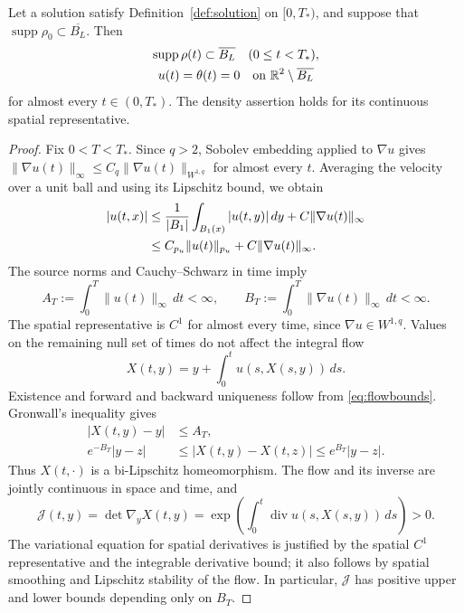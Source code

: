 \documentclass[10pt,twoside]{article}
\newcommand{\R}{\mathbb R}
\newcommand{\dt}{\,dt}
\newcommand{\Div}{\operatorname{div}}
\newcommand{\supp}{\operatorname{supp}}
\newcommand{\norm}[2]{\lVert#1\rVert_{#2}}
\begin{document}
\begin{proposition}\label{prop:fixedsupport}
Let a solution satisfy Definition~\ref{def:solution} on $[0,T_*)$,
and suppose that $\supp\rho_0\subset\overline{B_L}$. Then
\begin{equation}
 \begin{gathered}
 \supp\rho(t)\subset\overline{B_L}\quad(0\le t<T_*),\\
 u(t)=\theta(t)=0\quad\hbox{on }\R^2\setminus\overline{B_L}
 \end{gathered}
 \label{eq:fixedsupport}
\end{equation}
for almost every $t\in(0,T_*)$. The density assertion holds for its
continuous spatial representative.
\end{proposition}

\begin{proof}
Fix $0<T<T_*$. Since $q>2$, Sobolev embedding applied to $\nabla u$
gives
$\norm{\nabla u(t)}{\infty}
\le C_q\norm{\nabla u(t)}{W^{1,q}}$
for almost every $t$. Averaging the velocity over a unit ball and
using its Lipschitz bound, we obtain
\begin{align}
 |u(t,x)|
 &\le \frac1{|B_1|}\int_{B_1(x)}|u(t,y)|\,dy
           +C\norm{\nabla u(t)}{\infty}\notag\\
 &\le C_{p_u}\norm{u(t)}{p_u}
           +C\norm{\nabla u(t)}{\infty}.
 \label{eq:velocitybound}
\end{align}
The source norms and Cauchy--Schwarz in time imply
\begin{equation}
 A_T:=\int_0^T\norm{u(t)}{\infty}\dt<\infty,\qquad
 B_T:=\int_0^T\norm{\nabla u(t)}{\infty}\dt<\infty.
 \label{eq:flowbounds}
\end{equation}
The spatial representative is $C^1$ for almost every time, since
$\nabla u\in W^{1,q}$. Values on the remaining null set of times
do not affect the integral flow
\begin{equation}
 X(t,y)=y+\int_0^t u(s,X(s,y))\,ds.
 \label{eq:flow}
\end{equation}
Existence and forward and backward uniqueness follow from
\eqref{eq:flowbounds}. Gronwall's inequality gives
\begin{equation}
 \begin{aligned}
 |X(t,y)-y|&\le A_T,\\
 e^{-B_T}|y-z|&\le |X(t,y)-X(t,z)|
                        \le e^{B_T}|y-z|.
 \end{aligned}\label{eq:bilipschitz}
\end{equation}
Thus $X(t,\cdot)$ is a bi-Lipschitz homeomorphism. The flow and its
inverse are jointly continuous in space and time, and
\begin{equation}
 \mathcal J(t,y)=\det\nabla_yX(t,y)
    =\exp\left(\int_0^t\Div u(s,X(s,y))\,ds\right)>0.
 \label{eq:jacobian}
\end{equation}
The variational equation for spatial derivatives is justified by
the spatial $C^1$ representative and the integrable derivative bound;
it also follows by spatial smoothing and Lipschitz stability of the
flow. In particular, $\mathcal J$ has positive upper and lower bounds
depending only on $B_T$.


\end{proof}
\end{document}
